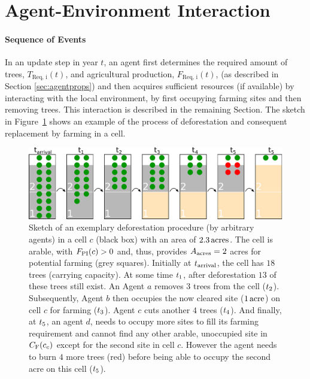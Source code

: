 \FloatBarrier
\section{Agent-Environment Interaction} \label{sec:Harvest}
\paragraph{Sequence of Events}
In an update step in year $t$, an agent first determines the required amount of trees, $T_\text{Req, i}(t)$, and agricultural production, $F_\text{Req, i}(t)$, (as described in Section \ref{sec:agentprops}) and then acquires sufficient resources (if available) by interacting with the local environment, by first occupying farming sites and then removing trees.
This interaction is described in the remaining Section.
The sketch in Figure~\ref{fig:treeburning} shows an example of the process of deforestation and consequent replacement by farming in a cell.
\begin{figure}
	\centering
	\includegraphics[width=\textwidth]{images/SketchABM2/burningSketch.pdf}
	\caption{Sketch of an exemplary deforestation procedure (by arbitrary agents) in a cell $c$ (black box) with an area of $2.3\, \rm{acres}$.
		The cell is arable, with $F_{\rm PI}(c)>0$ and, thus, provides $A_{\rm acres}=2$ acres for potential farming (grey squares).
		Initially at $t_{\rm arrival}$, the cell has $18$ trees (carrying capacity).
		At some time $t_{\rm 1}$, after deforestation $13$ of these trees still exist. 
		An Agent $a$ removes $3$ trees from the cell (\ra $t_{\rm 2}$). 
		Subsequently, Agent $b$ then occupies the now cleared site ($1\, {\rm acre}$) on cell $c$ for farming (\ra $t_{\rm 3}$). 
		Agent $c$ cuts another $4$ trees (\ra $t_{\rm 4}$).
		And finally, at $t_{\rm 5}$, an agent $d$, needs to occupy more sites to fill its farming requirement and cannot find any other arable, unoccupied site in $C_{\rm F}(c_c)$ except for the second site in cell $c$. 
		However the agent needs to burn $4$ more trees (red) before being able to occupy the second acre on this cell (\ra $t_{\rm 5}$).}
	\label{fig:treeburning}
\end{figure}

